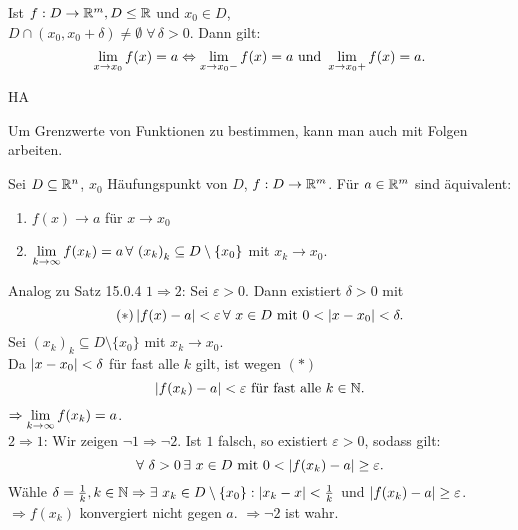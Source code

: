 \documentclass[../ana1.tex]{subfiles}
\begin{document}
\begin{bem}
    Ist \( f: D \rightarrow \mathbb{R}^m, D \leq \mathbb{R} \) und \( x_0 \in D \),\\
    \( D \cap (x_0, x_0 + \delta) \neq \emptyset \;\forall \, 
    \delta > 0 \). Dann gilt: 
    \[ \lim\limits_{x\rightarrow x_0} f(x) = a \Leftrightarrow
    \lim\limits_{x\rightarrow x_0-} f(x) = a \text{ und } \lim\limits_{x\rightarrow x_0+} 
    f(x) = a. \]
\end{bem}
\begin{bew}
    HA
\end{bew}
Um Grenzwerte von Funktionen zu bestimmen, kann man auch 
mit Folgen arbeiten.
\begin{satz}
    Sei \( D \subseteq \mathbb{R}^n \), \(x_0 \) Häufungspunkt von 
    \( D \), \( f: D \rightarrow \mathbb{R}^m \). Für \( a\in \mathbb{R}^m \) 
    sind äquivalent:
    \begin{enumerate}
        \item \( f(x) \rightarrow a \) für \( x\rightarrow x_0 \)
        \item \( \limes{k} f(x_k) = a \,\forall \, {(x_k)}_k 
        \subseteq D \setminus \{x_0\} \) mit \( x_k \rightarrow x_0 \).
    \end{enumerate}
\end{satz}
\begin{bew}
    Analog zu Satz 15.0.4
    \( 1 \Rightarrow 2 \): Sei \( \varepsilon > 0 \). Dann 
    existiert \( \delta > 0 \) mit 
    \[ (*) \abs{f(x) - a} < \varepsilon \,\forall \, x\in D 
    \text{ mit } 0 < \abs{x-x_0} < \delta. \]
    Sei \( {(x_k)}_k \subseteq D \setminus \{x_0\} \) mit 
    \( x_k \rightarrow x_0 \).\\
    Da \( \left|x-x_0\right| < \delta \) für fast alle \(k\) gilt, 
    ist wegen \( (*) \)
    \[ \left|f(x_k) - a\right| < \varepsilon \text{ für fast alle } k\in\mathbb{N}. \]
    \( \Rightarrow \lim\limits_{k\rightarrow\infty} f(x_k) = a \).\\
    \( 2 \Rightarrow 1\): Wir zeigen 
    \( \neg 1 \Rightarrow \neg 2\).
    Ist \( 1 \) falsch, so existiert \( \varepsilon > 0 \), sodass
    gilt: 
    \[ \forall \, \delta > 0 \,\exists \, x \in D \text{ mit } 0 < 
    \abs{f(x_k) - a} \geq \varepsilon. \]
    Wähle \( \delta = \frac{1}{k}, k\in\N \Rightarrow \exists \, x_k 
    \in D\setminus \{ x_0 \} : \abs{x_k - x} < \frac{1}{k} \) und 
    \( \left|f(x_k) - a\right| \geq \varepsilon \).\\
    \( \Rightarrow f(x_k) \) konvergiert nicht gegen \(a\). 
    \( \Rightarrow \neg 2 \) ist wahr.
\end{bew}
\end{document}
